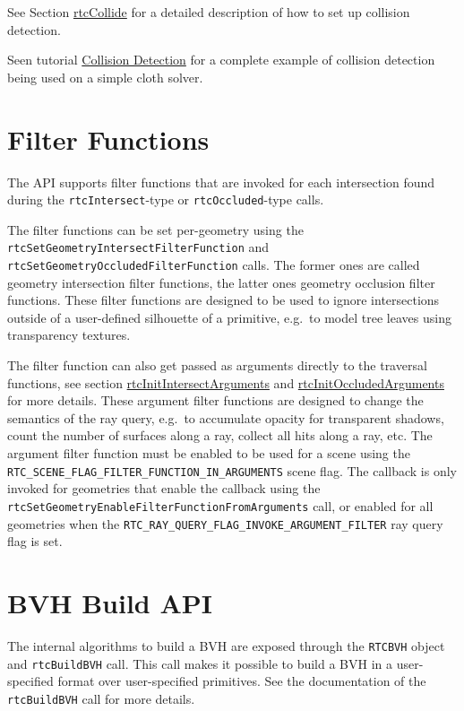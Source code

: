 See Section \hyperref[rtccollide]{rtcCollide} for a detailed description
of how to set up collision detection.

Seen tutorial \hyperref[collision-detection]{Collision Detection} for a
complete example of collision detection being used on a simple cloth
solver.

\section{Filter Functions}\label{filter-functions}

The API supports filter functions that are invoked for each intersection
found during the \texttt{rtcIntersect}-type or \texttt{rtcOccluded}-type
calls.

The filter functions can be set per-geometry using the
\texttt{rtcSetGeometryIntersectFilterFunction} and
\texttt{rtcSetGeometryOccludedFilterFunction} calls. The former ones are
called geometry intersection filter functions, the latter ones geometry
occlusion filter functions. These filter functions are designed to be
used to ignore intersections outside of a user-defined silhouette of a
primitive, e.g.~to model tree leaves using transparency textures.

The filter function can also get passed as arguments directly to the
traversal functions, see section
\hyperref[rtcinitintersectarguments]{rtcInitIntersectArguments} and
\hyperref[rtcinitoccludedarguments]{rtcInitOccludedArguments} for more
details. These argument filter functions are designed to change the
semantics of the ray query, e.g.~to accumulate opacity for transparent
shadows, count the number of surfaces along a ray, collect all hits
along a ray, etc. The argument filter function must be enabled to be
used for a scene using the
\texttt{RTC\_SCENE\_FLAG\_FILTER\_FUNCTION\_IN\_ARGUMENTS} scene flag.
The callback is only invoked for geometries that enable the callback
using the \texttt{rtcSetGeometryEnableFilterFunctionFromArguments} call,
or enabled for all geometries when the
\texttt{RTC\_RAY\_QUERY\_FLAG\_INVOKE\_ARGUMENT\_FILTER} ray query flag
is set.

\section{BVH Build API}\label{bvh-build-api}

The internal algorithms to build a BVH are exposed through the
\texttt{RTCBVH} object and \texttt{rtcBuildBVH} call. This call makes it
possible to build a BVH in a user-specified format over user-specified
primitives. See the documentation of the \texttt{rtcBuildBVH} call for
more details.

